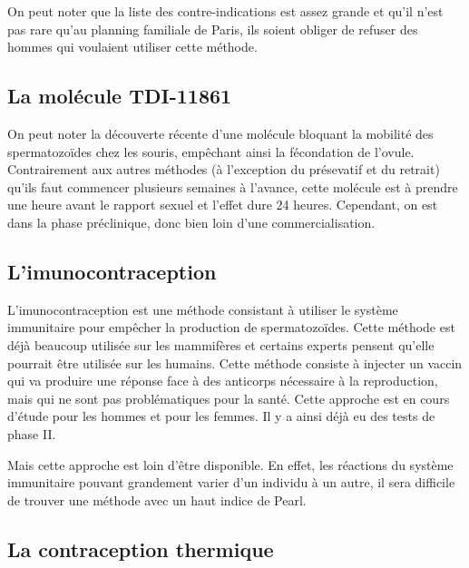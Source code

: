 \documentclass[12pt,a4paper]{report}
\begin{document}
On peut noter que la liste des contre-indications est assez grande et qu'il n'est pas rare qu'au planning familiale de Paris, ils soient obliger de refuser des hommes qui voulaient utiliser cette méthode. \cite{guillaumedaudinContraceptesEnqueteDernier2022}

\subsection{La molécule TDI-11861}

On peut noter la découverte récente d'une molécule bloquant la mobilité des spermatozoïdes chez les souris, empêchant ainsi la fécondation de l'ovule.
Contrairement aux autres méthodes (à l'exception du présevatif et du retrait) qu'ils faut commencer plusieurs semaines à l'avance, cette molécule est à prendre une heure avant le rapport sexuel et l'effet dure 24 heures. \cite{balbachOndemandMaleContraception2023}
Cependant, on est dans la phase préclinique, donc bien loin d'une commercialisation. \cite{DeveloppementMedicamentInserm}

\subsection{L'imunocontraception} \label{section:imunocontraception}

L'imunocontraception est une méthode consistant à utiliser le système immunitaire pour empêcher la production de spermatozoïdes.
Cette méthode est déjà beaucoup utilisée sur les mammifères et certains experts pensent qu'elle pourrait être utilisée sur les humains. \cite{ImmunocontraceptionWikipedia}
Cette méthode consiste à injecter un vaccin qui va produire une réponse face à des anticorps nécessaire à la reproduction, mais qui ne sont pas problématiques pour la santé.
Cette approche est en cours d'étude pour les hommes et pour les femmes. Il y a ainsi déjà eu des tests de phase II. \cite{mclaughlinThereRoleImmunocontraception2011}

Mais cette approche est loin d'être disponible. En effet, les réactions du système immunitaire pouvant grandement varier d'un individu à un autre, il sera difficile de trouver une méthode avec un haut indice de Pearl. \cite{mclaughlinThereRoleImmunocontraception2011}

\subsection{La contraception thermique} \label{section:thermique}
\end{document}
